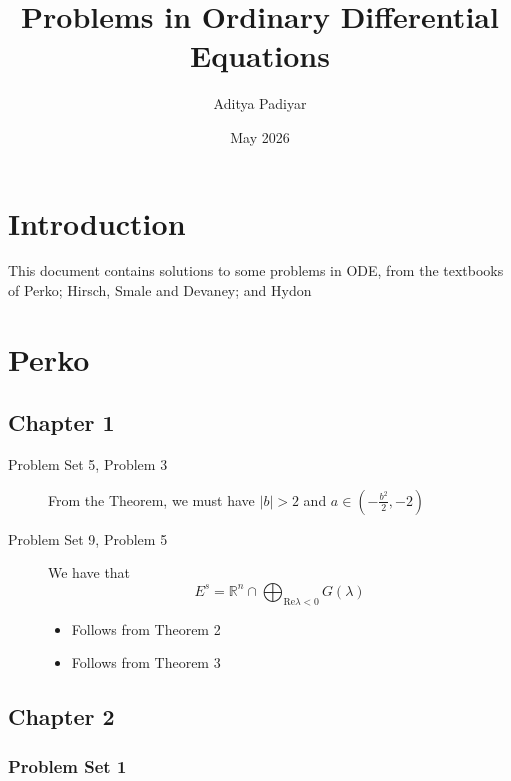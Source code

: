 \documentclass{article}
\title{Problems in Ordinary Differential Equations}
\author{Aditya Padiyar}
\date{May 2026}
\begin{document}
\maketitle

\section{Introduction}
This document contains solutions to some problems in ODE, from the textbooks of Perko; Hirsch, Smale and Devaney; and Hydon

\section{Perko}

\subsection*{Chapter 1}

\begin{description}
    \item [Problem Set 5, Problem 3] 
        From the Theorem, we must have $|b|>2$ and $a \in (-\frac{b^2}{2},-2)$
    
    \item [Problem Set 9, Problem 5] 
        We have that \[E^s=\mathbb{R}^n \cap \bigoplus_{\text{Re}\lambda<0} G(\lambda)\]
        
        \begin{itemize}
            \item [a] Follows from Theorem 2
            \item [b] Follows from Theorem 3
        \end{itemize}
\end{description}

\subsection*{Chapter 2}

\subsubsection*{Problem Set 1}
\end{document}

